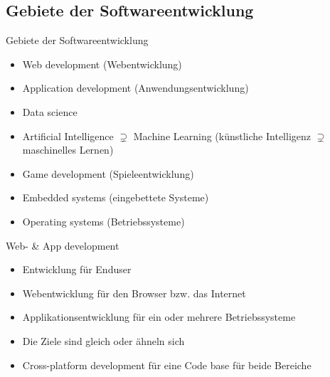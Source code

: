 \subsection{Gebiete der Softwareentwicklung}

\begin{frame}{Gebiete der Softwareentwicklung}
    \begin{itemize}
        \item Web development (Webentwicklung)
        \item Application development (Anwendungsentwicklung)
        \item Data science
        \item Artificial Intelligence $\supsetneq$ Machine Learning
              (künstliche Intelligenz $\supsetneq$ maschinelles Lernen)
        \item Game development (Spieleentwicklung)
        \item Embedded systems (eingebettete Systeme)
        \item Operating systems (Betriebssysteme)
    \end{itemize}

\end{frame}

\begin{frame}{Web- \& App development}
    \begin{itemize}
        \item Entwicklung für Enduser
        \item Webentwicklung für den Browser bzw. das Internet
        \item Applikationsentwicklung für ein oder mehrere Betriebssysteme
        \item Die Ziele sind gleich oder ähneln sich
        \item Cross-platform development für eine Code base für beide Bereiche
    \end{itemize}

    \note{

    }
\end{frame}


